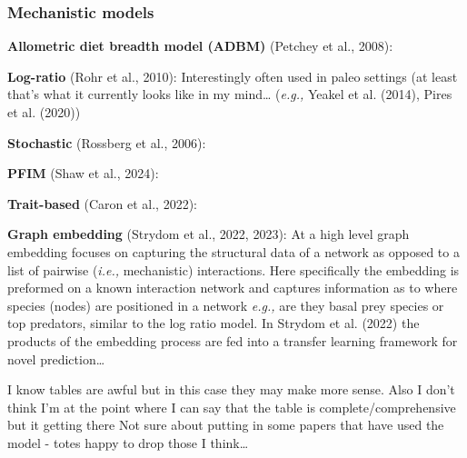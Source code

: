 \documentclass[
]{agujournal2019}
\begin{document}
\subsubsection{Mechanistic models}\label{mechanistic-models}

\textbf{Allometric diet breadth model (ADBM)} (Petchey et al., 2008):

\textbf{Log-ratio} (Rohr et al., 2010): Interestingly often used in
paleo settings (at least that's what it currently looks like in my
mind\ldots{} (\emph{e.g.,} Yeakel et al. (2014), Pires et al. (2020))

\textbf{Stochastic} (Rossberg et al., 2006):

\textbf{PFIM} (Shaw et al., 2024):

\textbf{Trait-based} (Caron et al., 2022):

\textbf{Graph embedding} (Strydom et al., 2022, 2023): At a high level
graph embedding focuses on capturing the structural data of a network as
opposed to a list of pairwise (\emph{i.e.,} mechanistic) interactions.
Here specifically the embedding is preformed on a known interaction
network and captures information as to where species (nodes) are
positioned in a network \emph{e.g.,} are they basal prey species or top
predators, similar to the log ratio model. In Strydom et al. (2022) the
products of the embedding process are fed into a transfer learning
framework for novel prediction\ldots{}

I know tables are awful but in this case they may make more sense. Also
I don't think I'm at the point where I can say that the table is
complete/comprehensive but it getting there Not sure about putting in
some papers that have used the model - totes happy to drop those I
think\ldots{}
\end{document}
